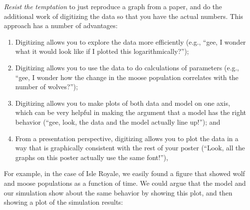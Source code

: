 {\it Resist the temptation} to just reproduce a graph from a paper, and do the additional work of digitizing the data so that you have the actual numbers.  This approach has a number of advantages:

\begin{enumerate}
\item Digitizing allows you to explore the data more efficiently (e.g., ``gee, I wonder what it would look like if I plotted this logarithmically?'');
\item Digitizing allows you to use the data to do calculations of parameters (e.g., ``gee, I wonder how the change in the moose population correlates with the number of wolves?'');
\item Digitizing allows you to make plots of both data and model on one axis, which can be very helpful in making the argument that a model has the right behavior (``gee, look, the data and the model actually line up!''); and
\item From a presentation perspective, digitizing allows you to plot the data in a way that is graphically consistent with the rest of your poster (``Look, all the graphs on this poster actually use the same font!''), 
\end{enumerate}

For example, in the case of Isle Royale, we easily found a figure that showed wolf and moose populations as a function of time.  We could argue that the model and our simulation show about the same behavior by showing this plot, and then showing a plot of the simulation results:

